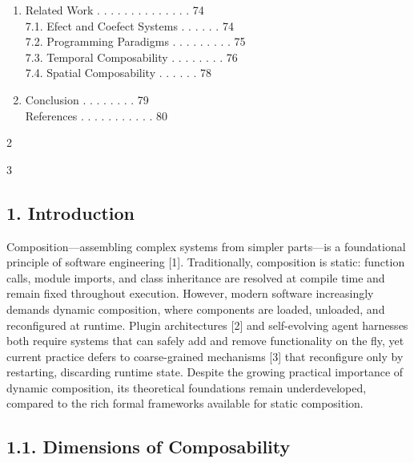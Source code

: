 \documentclass[
  10
]{article}
\begin{document}
\begin{enumerate}
  . . . . . . . 71\\
  6.6. Dependency Typing and Versioning . . . . . . . . . 72\\
  6.7. Co-Design with Languages and Operating Systems . . . . . . . . .
  . . . . . . . . . . . . . . . . . . . . . . . 73\\
\item
  Related Work . . . . . . . . . . . . . . 74\\
  7.1. Efect and Coefect Systems . . . . . . 74\\
  7.2. Programming Paradigms . . . . . . . . . 75\\
  7.3. Temporal Composability . . . . . . . . 76\\
  7.4. Spatial Composability . . . . . . 78\\
\item
  Conclusion . . . . . . . . 79\\
  References . . . . . . . . . . . 80
\end{enumerate}

2

3

\subsection{1. Introduction}\label{introduction}

Composition---assembling complex systems from simpler parts---is a
foundational principle of software engineering {[}1{]}. Traditionally,
composition is static: function calls, module imports, and class
inheritance are resolved at compile time and remain fixed throughout
execution. However, modern software increasingly demands dynamic
composition, where components are loaded, unloaded, and reconfigured at
runtime. Plugin architectures {[}2{]} and self-evolving agent harnesses
both require systems that can safely add and remove functionality on the
fly, yet current practice defers to coarse-grained mechanisms {[}3{]}
that reconfigure only by restarting, discarding runtime state. Despite
the growing practical importance of dynamic composition, its theoretical
foundations remain underdeveloped, compared to the rich formal
frameworks available for static composition.

\subsection{1.1. Dimensions of
Composability}\label{dimensions-of-composability}
\end{document}
